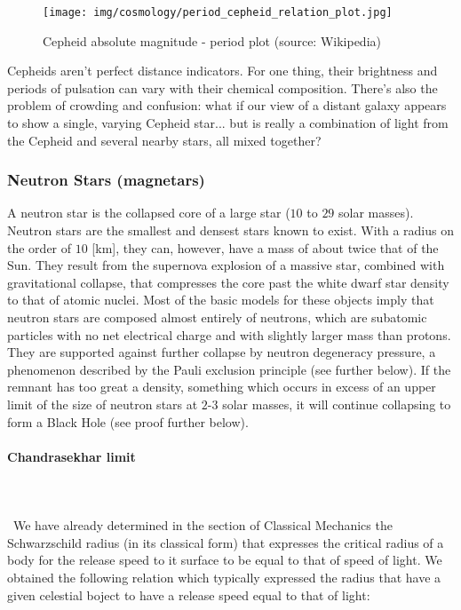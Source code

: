 	\begin{figure}[H]
		\begin{center}
		\texttt{[image: img/cosmology/period\_cepheid\_relation\_plot.jpg]}
		\caption[Cepheid absolute magnitude - period plot]{Cepheid absolute magnitude - period plot (source: Wikipedia)}
		\end{center}
	\end{figure}
	Cepheids aren't perfect distance indicators. For one thing, their brightness and periods of pulsation can vary with their chemical composition. There's also the problem of crowding and confusion: what if our view of a distant galaxy appears to show a single, varying Cepheid star... but is really a combination of light from the Cepheid and several nearby stars, all mixed together?
	
	\subsubsection{Neutron Stars (magnetars)}
	A neutron star is the collapsed core of a large star ($10$ to $29$ solar masses). Neutron stars are the smallest and densest stars known to exist. With a radius on the order of $10$ [km], they can, however, have a mass of about twice that of the Sun. They result from the supernova explosion of a massive star, combined with gravitational collapse, that compresses the core past the white dwarf star density to that of atomic nuclei. Most of the basic models for these objects imply that neutron stars are composed almost entirely of neutrons, which are subatomic particles with no net electrical charge and with slightly larger mass than protons. They are supported against further collapse by neutron degeneracy pressure, a phenomenon described by the Pauli exclusion principle (see further below). If the remnant has too great a density, something which occurs in excess of an upper limit of the size of neutron stars at $2$-$3$ solar masses, it will continue collapsing to form a Black Hole (see proof further below).
	
	\paragraph{Chandrasekhar limit}\mbox{}\\\\\
	We have already determined in the section of Classical Mechanics the Schwarzschild radius (in its classical form) that expresses the critical radius of a body for the release speed to it surface to be equal to that of speed of light. We obtained the following relation which typically expressed the radius that have a given celestial boject to have a release speed equal to that of light:
	
